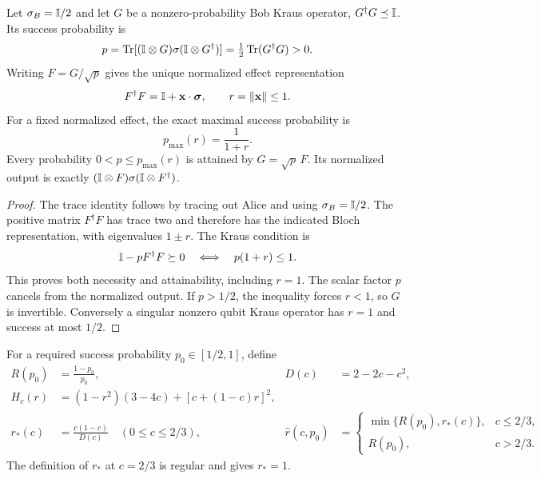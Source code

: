 \begin{lemma}\label{lem:success-probability-v2}
Let $\sigma_B=\mathbb I/2$ and let $G$ be a nonzero-probability Bob Kraus operator,
$G^\dagger G\preceq\mathbb I$. Its success probability is
\[
 p=\operatorname{Tr}[(\mathbb I\otimes G)\sigma(\mathbb I\otimes G^\dagger)]
   =\tfrac12\operatorname{Tr}(G^\dagger G)>0.
\]
Writing $F=G/\sqrt p$ gives the unique normalized effect representation
\[
 F^\dagger F=\mathbb I+\mathbf x\cdot\boldsymbol\sigma,\qquad r=\left\lVert\mathbf x\right\rVert\leq1.
\]
For a fixed normalized effect, the exact maximal success probability is
\begin{equation}\label{eq:pmax-v2}
 p_{\max}(r)=\frac1{1+r}.
\end{equation}
Every probability $0<p\leq p_{\max}(r)$ is attained by
$G=\sqrt p\,F$. Its normalized output is exactly
$(\mathbb I\otimes F)\sigma(\mathbb I\otimes F^\dagger)$.
\end{lemma}

\begin{proof}
The trace identity follows by tracing out Alice and using $\sigma_B=\mathbb I/2$.
The positive matrix $F^\dagger F$ has trace two and therefore has the indicated
Bloch representation, with eigenvalues $1\pm r$. The Kraus condition is
\[
 \mathbb I-pF^\dagger F\succeq0
 \quad\Longleftrightarrow\quad p(1+r)\leq1.
\]
This proves both necessity and attainability, including $r=1$. The scalar
factor $p$ cancels from the normalized output. If $p>1/2$, the inequality
forces $r<1$, so $G$ is invertible. Conversely a singular nonzero qubit Kraus
operator has $r=1$ and success at most $1/2$.
\end{proof}

For a required success probability $p_0\in[1/2,1]$, define
\begin{align}
 R(p_0)&=\frac{1-p_0}{p_0},&
 D(c)&=2-2c-c^2,\\
 H_c(r)&=(1-r^2)(3-4c)+[c+(1-c)r]^2,\label{eq:prob-H-v2}\\
 r_*(c)&=\frac{c(1-c)}{D(c)}\quad(0\leq c\leq2/3),&
 \widehat r(c,p_0)&=
 \begin{cases}\min\{R(p_0),r_*(c)\},&c\leq2/3,\\
 R(p_0),&c>2/3.
 \end{cases}\label{eq:prob-ropt-v2}
\end{align}
The definition of $r_*$ at $c=2/3$ is regular and gives $r_*=1$.

